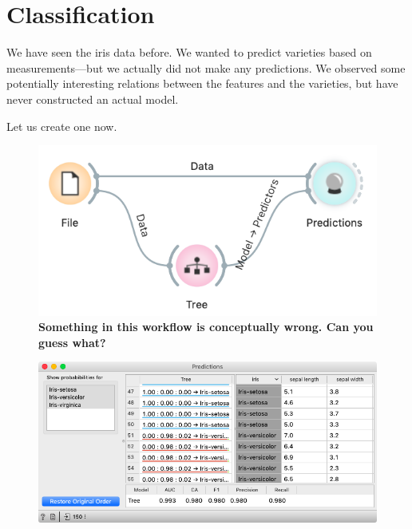 \chapter{Classification}
\label{ch:classification}

We have seen the iris data before. We wanted to predict varieties based on measurements---but we actually did not make any predictions. We observed some potentially interesting relations between the features and the varieties, but have never constructed an actual model.

Let us create one now.

\begin{figure}[h]
    \centering
    \vspace{-0.2cm}
    \includegraphics[scale=0.4]{predictions-workflow.png}
    \caption{\textbf{\textsf{Something in this workflow is conceptually wrong. Can you guess what?}}}
    \label{fig:spectral_preprocessing-fig2}
\end{figure}

\begin{figure}
    \includegraphics[scale=0.4]{predictions.png}
    \label{fig:classification-predictions}
\end{figure}

